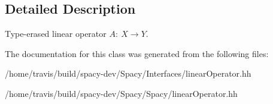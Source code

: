 \subsection{\-Detailed \-Description}
\-Type-\/erased linear operator $A:\ X \to Y $. 

\-The documentation for this class was generated from the following files\-:\begin{DoxyCompactItemize}
\item 
/home/travis/build/spacy-\/dev/\-Spacy/\-Interfaces/linear\-Operator.\-hh\item 
/home/travis/build/spacy-\/dev/\-Spacy/\-Spacy/linear\-Operator.\-hh\end{DoxyCompactItemize}
